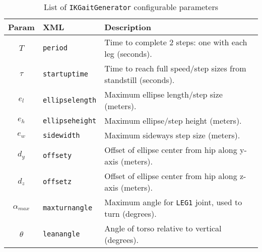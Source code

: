 \begin{table}
  \begin{tabular}{cll}
    Param & XML & Description \\
    \hline
    $T$ & {\tt period} & Time to complete 2 steps: one with each leg (seconds). \\
    $\tau$ & {\tt startuptime} & Time to reach full speed/step sizes from standstill (seconds). \\
    $e_l$ & {\tt ellipselength} & Maximum ellipse length/step size (meters). \\
    $e_h$ & {\tt ellipseheight} & Maximum ellipse/step height (meters). \\
    $e_w$ & {\tt sidewidth} & Maximum sideways step size (meters). \\
    $d_y$ & {\tt offsety} & Offset of ellipse center from hip along y-axis (meters). \\
    $d_z$ & {\tt offsetz} & Offset of ellipse center from hip along z-axis (meters). \\
    $\alpha_{max}$ & {\tt maxturnangle} & Maximum angle for {\tt LEG1} joint, used to turn (degrees). \\
    $\theta$ & {\tt leanangle} & Angle of torso relative to vertical (degrees).
  \end{tabular}
  \caption{List of {\tt IKGaitGenerator} configurable parameters \label{tab:ikparams}}
\end{table}

